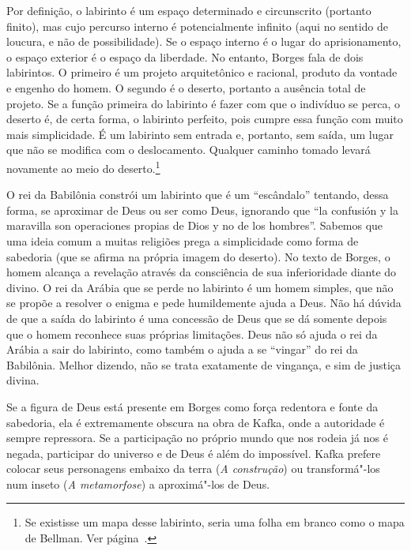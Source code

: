 Por definição, o labirinto é um espaço determinado e circunscrito
(portanto finito), mas cujo percurso interno é potencialmente infinito (aqui no sentido de loucura, e não de possibilidade). Se o
espaço interno é o lugar do aprisionamento, o espaço exterior é o espaço
da liberdade. No entanto, Borges fala de dois labirintos. O primeiro é
um projeto arquitetônico e racional, produto da vontade e engenho do
homem. O segundo é o deserto, portanto a ausência total de projeto. Se a
função primeira do labirinto é fazer com que o indivíduo se perca, o
deserto é, de certa forma, o labirinto perfeito, pois cumpre essa função
com muito mais simplicidade. É um labirinto sem entrada e, portanto, sem
saída, um lugar que não se modifica com o deslocamento. Qualquer caminho
tomado levará novamente ao meio do deserto.\footnote{Se existisse um
  mapa desse labirinto, seria uma folha em branco como o mapa de
  Bellman. Ver página~\pageref{bellman}.}

O rei da Babilônia constrói um labirinto que é um ``escândalo''
tentando, dessa forma, se aproximar de Deus ou ser como Deus, ignorando
que ``la confusión y la maravilla son operaciones propias de Dios y no
de los hombres''. Sabemos que uma ideia comum a muitas religiões prega a
simplicidade como forma de sabedoria (que se afirma na própria imagem do
deserto). No texto de Borges, o homem alcança a revelação através da
consciência de sua inferioridade diante do divino. O rei da Arábia que
se perde no labirinto é um homem simples, que não se propõe a resolver o
enigma e pede humildemente ajuda a Deus. Não há dúvida de que a saída do
labirinto é uma concessão de Deus que se dá somente depois que o homem
reconhece suas próprias limitações. Deus não só ajuda o rei da Arábia a
sair do labirinto, como também o ajuda a se ``vingar'' do rei da
Babilônia. Melhor dizendo, não se trata exatamente de vingança, e sim de
justiça divina.

Se a figura de Deus está presente em Borges como força redentora e fonte
da sabedoria, ela é extremamente obscura na obra de Kafka, onde a
autoridade é sempre repressora. Se a participação no próprio mundo que
nos rodeia já nos é negada, participar do universo e de Deus é além do
impossível. Kafka prefere colocar seus personagens embaixo da terra
(\emph{A construção}) ou transformá"-los num inseto (\emph{A
metamorfose}) a aproximá"-los de Deus.

